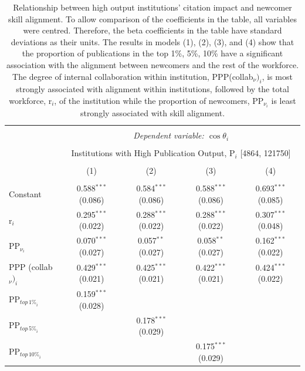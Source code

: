 \documentclass[draft,final]{vutinfth} %
\begin{document}
\begin{table}[!htbp] \centering 
  \caption{Relationship between high output institutions' citation impact and newcomer skill alignment. To allow comparison of the coefficients in the table, all variables were centred. Therefore, the beta coefficients in the table have standard deviations as their units. The results in models (1), (2), (3), and (4) show that the proportion of publications in the top 1\%, 5\%, 10\% have a significant association with the alignment between newcomers and the rest of the workforce. The degree of internal collaboration within institution, PPP(collab$_{\nu})_{i}$, is most strongly associated with alignment within institutions, followed by the total workforce, r$_{i}$, of the institution while the proportion of newcomers, PP$_{\nu_i}$ is least strongly associated with skill alignment.} 
  \label{Table S4} 
\small 
\scriptsize
\begin{tabularx}{\textwidth}{@{\extracolsep{\fill}}lcccc}
\\[-1.8ex]\hline 
\hline \\[-1.8ex] 
 & \multicolumn{4}{c}{\textit{Dependent variable: $\cos{\theta}_{i}$}} \\ 
\cline{2-5} 
\\[-1.8ex] & \multicolumn{4}{c}{Institutions with High Publication Output, P$_{i}$ [4864, 121750]} \\ 
\\[-1.8ex] & (1) & (2) & (3) & (4)\\ 
\hline \\[-1.8ex] 
 Constant & 0.588$^{***}$ (0.086) & 0.584$^{***}$ (0.086) & 0.588$^{***}$ (0.086) & 0.693$^{***}$ (0.085) \\ 
  r$_{i}$ & 0.295$^{***}$ (0.022) & 0.288$^{***}$ (0.022) & 0.288$^{***}$ (0.022) & 0.307$^{***}$ (0.048) \\ 
  PP$_{\nu_i}$ & 0.070$^{***}$ (0.027) & 0.057$^{**}$ (0.027) & 0.058$^{**}$ (0.027) & 0.162$^{***}$ (0.022) \\ 
  PPP (collab$_\nu)_{i}$ & 0.429$^{***}$ (0.021) & 0.425$^{***}$ (0.021) & 0.422$^{***}$ (0.021) & 0.424$^{***}$ (0.022) \\ 
  PP$_{{top\,1\%}_{i}}$ & 0.159$^{***}$ (0.028) &  &  &  \\ 
  PP$_{{top\,5\%}_{i}}$ &  & 0.178$^{***}$ (0.029) &  &  \\ 
  PP$_{{top\,10\%}_{i}}$ &  &  & 0.175$^{***}$ (0.029) &  \\ 

\end{tabularx}
\end{table}
\end{document}
